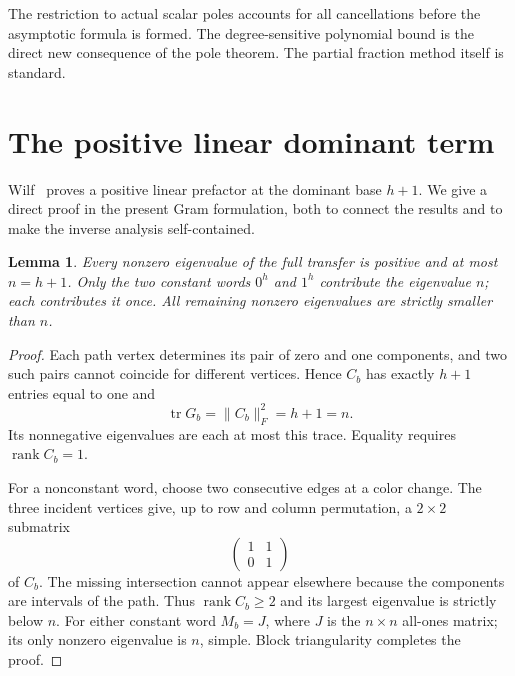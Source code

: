 \documentclass[11pt,letterpaper]{article}
\numberwithin{equation}{section}
\newtheorem{lemma}[theorem]{Lemma}
\theoremstyle{remark}\newtheorem{remark}[theorem]{Remark}
\DeclareMathOperator{\tr}{tr}\DeclareMathOperator{\TV}{TV}
\newcommand{\rank}{\operatorname{rank}}
\begin{document}
The restriction to actual scalar poles accounts for all cancellations before the asymptotic formula is formed. The degree-sensitive polynomial bound is the direct new consequence of the pole theorem. The partial fraction method itself is standard.

\section{The positive linear dominant term}\label{mdk:pl:sec:dominant}
Wilf~\cite{wilf} proves a positive linear prefactor at the dominant base $h+1$. We give a direct proof in the present Gram formulation, both to connect the results and to make the inverse analysis self-contained.

\begin{lemma}\label{mdk:pl:lem:dominant}
Every nonzero eigenvalue of the full transfer is positive and at most $n=h+1$. Only the two constant words $0^h$ and $1^h$ contribute the eigenvalue $n$; each contributes it once. All remaining nonzero eigenvalues are strictly smaller than $n$.
\end{lemma}
\begin{proof}
Each path vertex determines its pair of zero and one components, and two such pairs cannot coincide for different vertices. Hence $C_b$ has exactly $h+1$ entries equal to one and
\begin{equation}\label{mdk:pl:eq:trace}
 \tr G_b=\|C_b\|_F^2=h+1=n.
\end{equation}
Its nonnegative eigenvalues are each at most this trace. Equality requires $\rank C_b=1$.

For a nonconstant word, choose two consecutive edges at a color change. The three incident vertices give, up to row and column permutation, a $2\times2$ submatrix
\[
 \begin{pmatrix}1&1\\0&1\end{pmatrix}
\]
of $C_b$. The missing intersection cannot appear elsewhere because the components are intervals of the path. Thus $\rank C_b\ge2$ and its largest eigenvalue is strictly below $n$. For either constant word $M_b=J$, where $J$ is the $n\times n$ all-ones matrix; its only nonzero eigenvalue is $n$, simple. Block triangularity completes the proof.
\end{proof}
\end{document}
